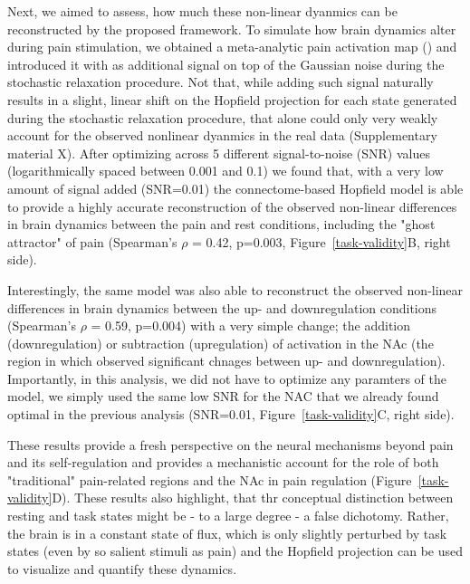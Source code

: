 \documentclass{article}
\begin{document}
Next, we aimed to assess, how much these non-linear dyanmics can be reconstructed by the proposed framework. To simulate how brain dynamics alter during pain stimulation, we obtained a meta-analytic pain activation map (\href{https://doi.org/10.1038/s41467-021-21179-3}{}) and introduced it with as additional signal on top of the Gaussian noise during the stochastic relaxation procedure. Not that, while adding such signal naturally results in a slight, linear shift on the Hopfield projection for each state generated during the stochastic relaxation procedure, that alone could only very weakly account for the observed nonlinear dyanmics in the real data (Supplementary material X). After optimizing across 5 different signal-to-noise (SNR) values (logarithmically spaced between 0.001 and 0.1) we found that, with a very low amount of signal added (SNR=0.01) the connectome-based Hopfield model is able to provide a highly accurate reconstruction of the observed non-linear differences in brain dynamics between the pain and rest conditions, including the "ghost attractor" of pain (Spearman's $\rho$ = 0.42, p=0.003, Figure~\ref{task-validity}B, right side).

Interestingly, the same model was also able to reconstruct the observed non-linear differences in brain dynamics between the up- and downregulation conditions (Spearman's $\rho$ = 0.59, p=0.004) with a very simple change; the addition (downregulation) or subtraction (upregulation) of activation in the NAc (the region in which \cite{Woo_2015} observed significant chnages between up- and downregulation). Importantly, in this analysis, we did not have to optimize any paramters of the model, we simply used the same low SNR for the NAC that we already found optimal in the previous analysis (SNR=0.01, Figure~\ref{task-validity}C, right side).

These results provide a fresh perspective on the neural mechanisms beyond pain and its self-regulation and provides a mechanistic account for the role of both "traditional" pain-related regions and the NAc in pain regulation (Figure~\ref{task-validity}D). These results also highlight, that thr conceptual distinction between resting and task states might be - to a large degree - a false dichotomy. Rather, the brain is in a constant state of flux, which is only slightly perturbed by task states (even by so salient stimuli as pain) and the Hopfield projection can be used to visualize and quantify these dynamics.
\end{document}
